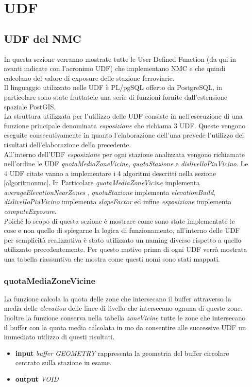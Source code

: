 \chapter{UDF}
\label{udf}
\section{UDF del NMC}
\label{udfnmc}
\justify
In questa sezione verranno mostrate tutte le User Defined Function (da qui in avanti indicate con l'acronimo UDF) che implementano NMC e che quindi calcolano del valore di exposure delle stazione ferroviarie.\\ Il linguaggio utilizzato nelle UDF è PL/pgSQL offerto da PostgreSQL, in particolare sono state fruttatele una serie di funzioni fornite dall’estensione spaziale PostGIS.\\
La struttura utilizzata per l'utilizzo delle UDF consiste in nell'esecuzione di una funzione principale denominata \textit{esposizione} che richiama 3 UDF. Queste vengono eseguite consecutivamente in quanto l'elaborazione dell'una prevede l'utilizzo dei risultati dell'elaborazione della precedente. \\
All'interno dell'UDF \textit{esposizione} per ogni stazione analizzata vengono richiamate nell'ordine le UDF \textit{quotaMediaZoneVicine}, \textit{quotaStazione} e \textit{dislivelloPiuVicino}. Le 4 UDF citate vanno a implementare i 4 algoritmi descritti nella sezione \ref{algoritmonmc}. In Particolare \textit{quotaMediaZoneVicine} implementa \textit{averageElevationNearZones} , \textit{quotaStazione} implementa \textit{elevationBuild}, \textit{dislivelloPiuVicino} implementa \textit{slopeFactor} ed infine \textit{esposizione} implementa \textit{computeExposure}.\\
Poiché lo scopo di questa sezione è mostrare come sono state implementate le cose e non quello di spiegarne la logica di funzionamento, all'interno delle UDF per semplicità realizzativa è stato utilizzato un naming diverso rispetto a quello utilizzato precedentemente. Per questo motivo prima di ogni UDF verrà mostrata una tabella riassuntiva che mostra come questi nomi sono stati mappati.   

\subsection{quotaMediaZoneVicine}
La funzione calcola la quota delle zone che intersecano il buffer attraverso la media delle \textit{elevation} delle linee di livello che intersecano ognuna di queste zone. Inoltre la funzione conserva nella tabella \textit{zoneVicine} tutte le zone che intersecano il buffer con la quota media calcolata in mo da consentire alle successive UDF un immediato utilizzo di questi risultati.
\begin{itemize}
\item \textbf{input} \textit{buffer GEOMETRY} rappresenta la geometria del buffer circolare centrato sulla stazione in esame.
\item \textbf{output} \textit{VOID}
\end{itemize} 

